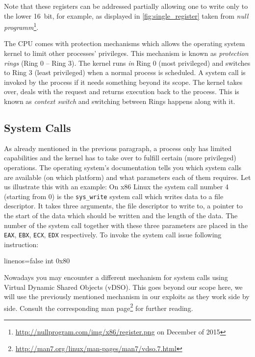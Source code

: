\documentclass[article]{uibk}
\begin{document}
Note that these registers can be addressed partially allowing one to write only
to the lower \SI{16}{bit}, for example, as displayed in
\cref{fig:single_register} taken from \textit{null
programm}\footnote{\url{http://nullprogram.com/img/x86/register.png} on
December of 2015}.

The CPU comes with protection mechanisms which allows the operating system
kernel to limit other processes' privileges. This mechanism is known as
\textit{protection rings} (Ring 0 -- Ring 3). The kernel runs \emph{in} Ring 0
(most privileged) and switches to Ring 3 (least privileged) when a normal
process is scheduled. A system call is invoked by the process if it needs
something beyond its scope. The kernel takes over, deals with the request and
returns execution back to the process. This is known as \textit{context switch}
and switching between Rings happens along with it.

\subsection{System Calls}

As already mentioned in the previous paragraph, a process only has limited
capabilities and the kernel has to take over to fulfill certain (more
privileged) operations. The operating system's documentation tells you which
system calls are available (on which platform) and what parameters
each of them requires. Let us illustrate this with an example: On x86 Linux the
system call
number 4 (starting from 0) is the \texttt{sys\_write} system call which writes
data to a file descriptor. It takes three arguments, the file descriptor to
write to, a pointer to the start of the data which should be written and the
length of the data. The number of the system call together with these three
parameters are placed in the \texttt{EAX}, \texttt{EBX}, \texttt{ECX},
\texttt{EDX} respectively. To invoke the system call issue following
instruction:

\begin{nasmcode*}{linenos=false}
    int     0x80
\end{nasmcode*}

Nowadays you may encounter a different mechanism for system calls using Virtual
Dynamic Shared Objects (vDSO). This goes beyond our scope here, we will use the
previously mentioned mechanism in our exploits as they work side by side.
Consult the corresponding man
page\footnote{\url{http://man7.org/linux/man-pages/man7/vdso.7.html}} for
further reading.
\end{document}
